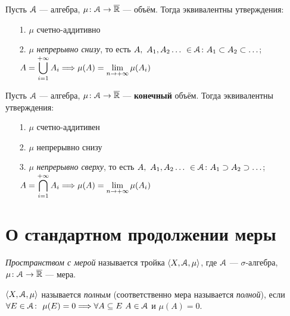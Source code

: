\begin{theorem}
    Пусть $\mathcal{A}$ --- алгебра, $\mu \colon \mathcal{A} \to \overline{\mathbb{R}}$ --- объём. Тогда
    эквивалентны утверждения:
    \begin{itemize}
        \item[1.] $\mu$ счетно-аддитивно
        \item[2.] $\mu$ \textit{непрерывно снизу}, то есть
        $\displaystyle A,~A_1, A_2 \ldots~ \in \mathcal{A}\colon A_1 \subset A_2 \subset \ldots$;
        $\displaystyle A = \bigcup_{i = 1}^{+\infty}{A_i} \Longrightarrow \\ \mu(A) = \lim_{n \to
        +\infty}{\mu(A_i)}$
    \end{itemize}
\end{theorem}

\begin{theorem}
    Пусть $\mathcal{A}$ --- алгебра, $\mu \colon \mathcal{A} \to \overline{\mathbb{R}}$ --- \textbf{конечный} объём.
    Тогда эквивалентны утверждения:
    \begin{itemize}
        \item[1.] $\mu$ счетно-аддитивен
        \item[2.] $\mu$ непрерывно снизу
        \item[3.] $\mu$ \textit{непрерывно сверху}, то есть
        $\displaystyle A,~A_1, A_2 \ldots~ \in \mathcal{A}\colon A_1 \supset A_2 \supset \ldots$;
        $\displaystyle A = \bigcap_{i = 1}^{+\infty}{A_i} \Longrightarrow \\ \mu(A) = \lim_{n \to
        +\infty}{\mu(A_i)}$
    \end{itemize}
\end{theorem}

\section{О стандартном продолжении меры}

\begin{definition}
    \textit{Пространством с мерой} называется тройка $\langle X, \mathcal{A}, \mu \rangle$,
    где $\mathcal{A}$ --- $\sigma$-алгебра, $\mu \colon \mathcal{A} \to \overline{\mathbb{R}}$ --- мера.
\end{definition}

\begin{definition}
    $\langle X, \mathcal{A}, \mu \rangle$ называется \textit{полным} (соответственно мера
    называется \textit{полной}), если $\forall E \in \mathcal{A} \colon~ \mu(E) = 0 \Longrightarrow
    \forall A \subseteq E~ A \in \mathcal{A}$ и $\mu(A) = 0$.
\end{definition}


